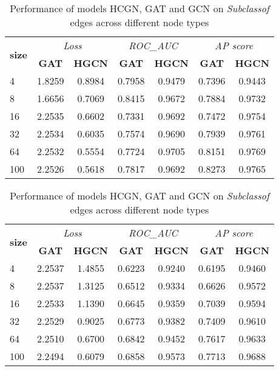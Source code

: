\begin{table}
    \vspace{1em}
    
    \begin{subtable}[t]{\textwidth}
        \centering
        \begin{tabular}{l|cc|cc|cc}        
            \toprule
            \multirow{2}{*}{\textbf{size}} & \multicolumn{2}{c}{\textit{Loss}} & \multicolumn{2}{c}{\textit{ROC\_AUC}} & \multicolumn{2}{c}{\textit{AP score}} \\
            & \textbf{GAT} & \textbf{HGCN} & \textbf{GAT} & \textbf{HGCN} & \textbf{GAT} & \textbf{HGCN} \\
            \midrule
            4 & 1.8259 & 0.8984 & 0.7958 & 0.9479 & 0.7396 & 0.9443 \\
            8 & 1.6656 & 0.7069 & 0.8415 & 0.9672 & 0.7884 & 0.9732 \\
            16 & 2.2535 & 0.6602 & 0.7331 & 0.9692 & 0.7472 & 0.9754 \\
            32 & 2.2534 & 0.6035 & 0.7574 & 0.9690 & 0.7939 & 0.9761 \\
            64 & 2.2532 & 0.5554 & 0.7724 & 0.9705 & 0.8151 & 0.9769 \\
            100 & 2.2526 & 0.5618 & 0.7817 & 0.9692 & 0.8273 & 0.9765 \\
            \bottomrule
        \end{tabular}
        \caption{Node type \textit{GO}}
    \end{subtable}
    
    \vspace{1em}
    
    \begin{subtable}[t]{\textwidth}
        \centering
        \begin{tabular}{l|cc|cc|cc}        
            \toprule
            \multirow{2}{*}{\textbf{size}} & \multicolumn{2}{c}{\textit{Loss}} & \multicolumn{2}{c}{\textit{ROC\_AUC}} & \multicolumn{2}{c}{\textit{AP score}} \\
            & \textbf{GAT} & \textbf{HGCN} & \textbf{GAT} & \textbf{HGCN} & \textbf{GAT} & \textbf{HGCN} \\
            \midrule
            4 & 2.2537 & 1.4855 & 0.6223 & 0.9240 & 0.6195 & 0.9460 \\
            8 & 2.2537 & 1.3125 & 0.6512 & 0.9334 & 0.6626 & 0.9572 \\
            16 & 2.2533 & 1.1390 & 0.6645 & 0.9359 & 0.7039 & 0.9594 \\
            32 & 2.2529 & 0.9025 & 0.6773 & 0.9382 & 0.7409 & 0.9610 \\
            64 & 2.2510 & 0.6700 & 0.6842 & 0.9452 & 0.7617 & 0.9633 \\
            100 & 2.2494 & 0.6079 & 0.6858 & 0.9573 & 0.7713 & 0.9688 \\
            \bottomrule
        \end{tabular}
        \caption{Node type \textit{Phenotype}}
    \end{subtable}
    
    \caption{Performance of models HCGN, GAT and GCN on \textit{Subclassof} edges across different node types}
\end{table}
